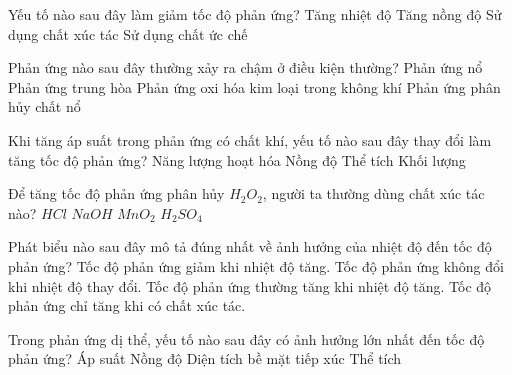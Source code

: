 \documentclass[Main.tex]{subfiles}
\begin{document}
\begin{ex}
	Yếu tố nào sau đây làm giảm tốc độ phản ứng?
	\choice
	{Tăng nhiệt độ}
	{Tăng nồng độ}
	{Sử dụng chất xúc tác}
	{\True Sử dụng chất ức chế}
\end{ex}

\begin{ex}
	Phản ứng nào sau đây thường xảy ra chậm ở điều kiện thường?
	\choice
	{Phản ứng nổ}
	{Phản ứng trung hòa}
	{\True Phản ứng oxi hóa kim loại trong không khí}
	{Phản ứng phân hủy chất nổ}
\end{ex}

\begin{ex}
	Khi tăng áp suất trong phản ứng có chất khí, yếu tố nào sau đây thay đổi làm tăng tốc độ phản ứng?
	\choice
	{Năng lượng hoạt hóa}
	{\True Nồng độ}
	{Thể tích}
	{Khối lượng}
\end{ex}
\begin{ex}
	Để tăng tốc độ phản ứng phân hủy $H_2O_2$, người ta thường dùng chất xúc tác nào?
	\choice
	{$HCl$}
	{$NaOH$}
	{\True $MnO_2$}
	{$H_2SO_4$}
\end{ex}

\begin{ex}
	Phát biểu nào sau đây mô tả đúng nhất về ảnh hưởng của nhiệt độ đến tốc độ phản ứng?
	\choice
	{Tốc độ phản ứng giảm khi nhiệt độ tăng.}
	{Tốc độ phản ứng không đổi khi nhiệt độ thay đổi.}
	{\True Tốc độ phản ứng thường tăng khi nhiệt độ tăng.}
	{Tốc độ phản ứng chỉ tăng khi có chất xúc tác.}
\end{ex}

\begin{ex}
	Trong phản ứng dị thể, yếu tố nào sau đây có ảnh hưởng lớn nhất đến tốc độ phản ứng?
	\choice
	{Áp suất}
	{Nồng độ}
	{\True Diện tích bề mặt tiếp xúc}
	{Thể tích}
\end{ex}
\end{document}
